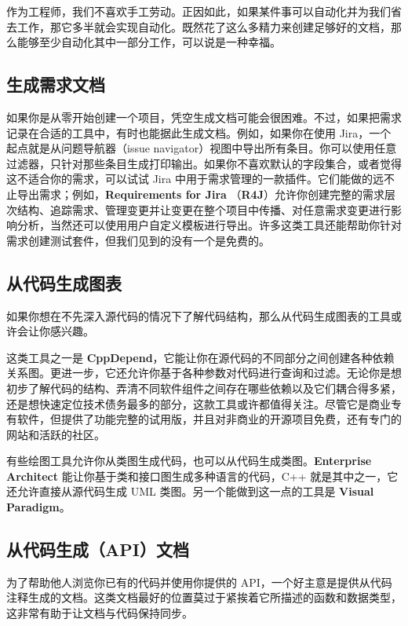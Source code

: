 \label{idx:244}
作为工程师，我们不喜欢手工劳动。正因如此，如果某件事可以自动化并为我们省去工作，那它多半就会实现自动化。既然花了这么多精力来创建足够好的文档，那么能够至少自动化其中一部分工作，可以说是一种幸福。

\subsection{生成需求文档}

\label{idx:245}
\label{idx:246}
如果你是从零开始创建一个项目，凭空生成文档可能会很困难。不过，如果把需求记录在合适的工具中，有时也能据此生成文档。例如，如果你在使用 Jira，一个起点就是从问题导航器（issue navigator）视图中导出所有条目。你可以使用任意过滤器，只针对那些条目生成打印输出。如果你不喜欢默认的字段集合，或者觉得这不适合你的需求，可以试试 Jira 中用于需求管理的一款插件。它们能做的远不止导出需求；例如，\textbf{Requirements for Jira }（\textbf{R4J}）允许你创建完整的需求层次结构、追踪需求、管理变更并让变更在整个项目中传播、对任意需求变更进行影响分析，当然还可以使用用户自定义模板进行导出。许多这类工具还能帮助你针对需求创建测试套件，但我们见到的没有一个是免费的。

\subsection{从代码生成图表}

\label{idx:247}
如果你想在不先深入源代码的情况下了解代码结构，那么从代码生成图表的工具或许会让你感兴趣。

\label{idx:248}
这类工具之一是 \textbf{CppDepend}，它能让你在源代码的不同部分之间创建各种依赖关系图。更进一步，它还允许你基于各种参数对代码进行查询和过滤。无论你是想初步了解代码的结构、弄清不同软件组件之间存在哪些依赖以及它们耦合得多紧，还是想快速定位技术债务最多的部分，这款工具或许都值得关注。尽管它是商业专有软件，但提供了功能完整的试用版，并且对非商业的开源项目免费，还有专门的网站和活跃的社区。

\label{idx:249}
\label{idx:250}
有些绘图工具允许你从类图生成代码，也可以从代码生成类图。\textbf{Enterprise Architect} 能让你基于类和接口图生成多种语言的代码，C++ 就是其中之一，它还允许直接从源代码生成 UML 类图。另一个能做到这一点的工具是 \textbf{Visual Paradigm}。

\subsection{从代码生成（API）文档}

\label{idx:251}
为了帮助他人浏览你已有的代码并使用你提供的 API，一个好主意是提供从代码注释生成的文档。这类文档最好的位置莫过于紧挨着它所描述的函数和数据类型，这非常有助于让文档与代码保持同步。

